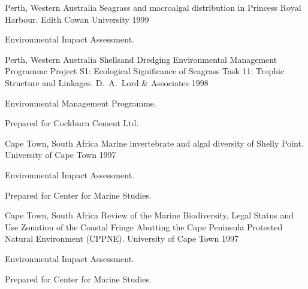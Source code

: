 \begin{cventries}
\cventry
{Perth, Western Australia} %
{Seagrass and macroalgal distribution in Princess Royal Harbour.} %
{Edith Cowan University} %
{1999} %
{ %
\begin{cvitems}
\item {Environmental Impact Assessment.}
\end{cvitems} 
}


\cventry
{Perth, Western Australia} %
{Shellsand Dredging Environmental Management Programme Project S1: Ecological Significance of Seagrass Task 11: Trophic Structure and Linkages.} %
{D.~A.~Lord \& Associates} %
{1998} %
{ %
\begin{cvitems}
\item {Environmental Management Programme.}
\item Prepared for Cockburn Cement Ltd.
\end{cvitems} 
}


\cventry
{Cape Town, South Africa} %
{Marine invertebrate and algal diversity of Shelly Point.} %
{University of Cape Town} %
{1997} %
{ %
\begin{cvitems}
\item {Environmental Impact Assessment.}
\item Prepared for Center for Marine Studies.
\end{cvitems} 
}


\cventry
{Cape Town, South Africa} %
{Review of the Marine Biodiversity, Legal Status and Use Zonation of the Coastal Fringe Abutting the Cape Peninsula Protected Natural Environment (CPPNE).} %
{University of Cape Town} %
{1997} %
{ %
\begin{cvitems}
\item {Environmental Impact Assessment.}
\item Prepared for Center for Marine Studies.
\end{cvitems} 
}



\end{cventries}
